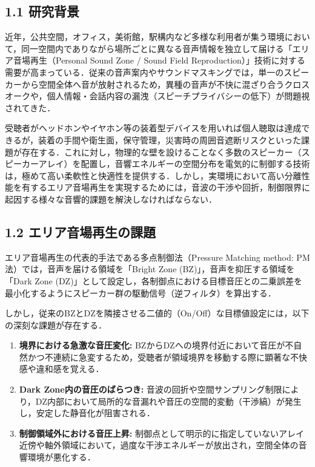 \documentclass[11pt, a4paper]{article}
\begin{document}
\subsection{1.1 研究背景}
近年，公共空間，オフィス，美術館，駅構内など多様な利用者が集う環境において，同一空間内でありながら場所ごとに異なる音声情報を独立して届ける「エリア音場再生（Personal Sound Zone / Sound Field Reproduction）」技術に対する需要が高まっている．従来の音声案内やサウンドマスキングでは，単一のスピーカーから空間全体へ音が放射されるため，異種の音声が不快に混ざり合うクロスオークや，個人情報・会話内容の漏洩（スピーチプライバシーの低下）が問題視されてきた．

受聴者がヘッドホンやイヤホン等の装着型デバイスを用いれば個人聴取は達成できるが，装着の手間や衛生面，保守管理，災害時の周囲音遮断リスクといった課題が存在する．これに対し，物理的な壁を設けることなく多数のスピーカー（スピーカーアレイ）を配置し，音響エネルギーの空間分布を電気的に制御する技術は，極めて高い柔軟性と快適性を提供する．しかし，実環境において高い分離性能を有するエリア音場再生を実現するためには，音波の干渉や回折，制御限界に起因する様々な音響的課題を解決しなければならない．

\subsection{1.2 エリア音場再生の課題}
エリア音場再生の代表的手法である多点制御法（Pressure Matching method: PM法）では，音声を届ける領域を「Bright Zone (BZ)」，音声を抑圧する領域を「Dark Zone (DZ)」として設定し，各制御点における目標音圧との二乗誤差を最小化するようにスピーカー群の駆動信号（逆フィルタ）を算出する．

しかし，従来のBZとDZを隣接させる二値的（On/Off）な目標値設定には，以下の深刻な課題が存在する．
\begin{enumerate}
    \item \textbf{境界における急激な音圧変化:} BZからDZへの境界付近において音圧が不自然かつ不連続に急変するため，受聴者が領域境界を移動する際に顕著な不快感や違和感を覚える．
    \item \textbf{Dark Zone内の音圧のばらつき:} 音波の回折や空間サンプリング制限により，DZ内部において局所的な音漏れや音圧の空間的変動（干渉縞）が発生し，安定した静音化が阻害される．
    \item \textbf{制御領域外における音圧上昇:} 制御点として明示的に指定していないアレイ近傍や軸外領域において，過度な干渉エネルギーが放出され，空間全体の音響環境が悪化する．
\end{enumerate}
\end{document}
